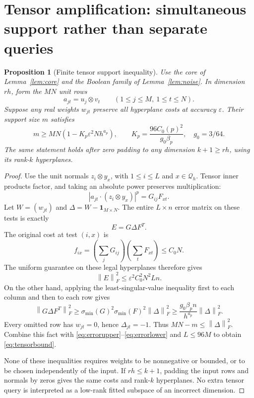 \documentclass[11pt]{article}
\newtheorem{proposition}[theorem]{Proposition}
\theoremstyle{remark}\newtheorem{remark}[theorem]{Remark}
\newcommand{\eps}{\varepsilon}\newcommand{\norm}[1]{\left\|#1\right\|}
\begin{document}
\section{Tensor amplification: simultaneous support rather than separate queries}\label{sec:tensor}
\begin{proposition}[Finite tensor support inequality]\label{prop:tensor}
Use the core of Lemma~\ref{lem:core} and the Boolean family of Lemma~\ref{lem:noise}. In dimension $rh$, form the $MN$ unit rows
\begin{equation}\label{eq:tensorrows}
 a_{jt}=u_j\otimes v_t\qquad(1\le j\le M,\ 1\le t\le N).
\end{equation}
Suppose any real weights $w_{jt}$ preserve all hyperplane costs at accuracy $\eps$. Their support size $m$ satisfies
\begin{equation}\label{eq:tensorbound}
 m\ge MN\left(1-K_p\eps^2Nh^{a_p}\right),
 \qquad K_p=\frac{96C_0(p)^2}{g_0\beta_p},\quad g_0=3/64.
\end{equation}
The same statement holds after zero padding to any dimension $k+1\ge rh$, using its rank-$k$ hyperplanes.
\end{proposition}
\begin{proof}
Use the unit normals $z_i\otimes y_x$, with $1\le i\le L$ and $x\in\mathcal Q_h$. Tensor inner products factor, and taking an absolute power preserves multiplication:
\[
 |a_{jt}\cdot(z_i\otimes y_x)|^p=G_{ij}F_{xt}.
\]
Let $W=(w_{jt})$ and $\Delta=W-\boldsymbol1_{M\times N}$. The entire $L\times n$ error matrix on these tests is exactly
\begin{equation}\label{eq:matrixerror}
 E=G\Delta F^T.
\end{equation}
The original cost at test $(i,x)$ is
\[
 f_{ix}=\left(\sum_jG_{ij}\right)\left(\sum_tF_{xt}\right)\le C_0N.
\]
The uniform guarantee on these legal hyperplanes therefore gives
\begin{equation}\label{eq:errorupper}
 \norm E_F^2\le\eps^2 C_0^2N^2Ln.
\end{equation}
On the other hand, applying the least-singular-value inequality first to each column and then to each row gives
\begin{equation}\label{eq:errorlower}
 \norm{G\Delta F^T}_F^2
 \ge\sigma_{\min}(G)^2\sigma_{\min}(F)^2\norm\Delta_F^2
 \ge\frac{g_0\beta_p n}{h^{a_p}}\norm\Delta_F^2.
\end{equation}
Every omitted row has $w_{jt}=0$, hence $\Delta_{jt}=-1$. Thus $MN-m\le\norm\Delta_F^2$. Combine this fact with \eqref{eq:errorupper}--\eqref{eq:errorlower} and $L\le96M$ to obtain \eqref{eq:tensorbound}.

None of these inequalities requires weights to be nonnegative or bounded, or to be chosen independently of the input. If $rh\le k+1$, padding the input rows and normals by zeros gives the same costs and rank-$k$ hyperplanes. No extra tensor query is interpreted as a low-rank fitted subspace of an incorrect dimension.
\end{proof}
\end{document}
